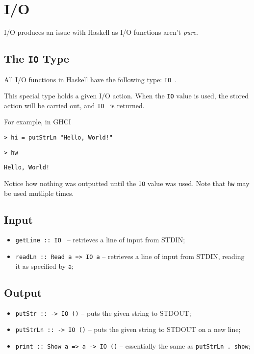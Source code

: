 \section{I/O}

I/O produces an issue with Haskell as I/O functions aren't \textit{pure}.

\subsection{The \texttt{IO} Type}
All I/O functions in Haskell have the following type: \texttt{IO }.

This special type holds a given I/O action. When the \texttt{IO} value is used, the stored action will be carried out, and \texttt{IO } is returned.

For example, in GHCI

\texttt{> hi = putStrLn "Hello, World!"}

\texttt{> hw}

\texttt{Hello, World!}

Notice how nothing was outputted until the \texttt{IO} value was used. Note that \texttt{hw} may be used mutliple times.

\subsection{Input}
\begin{itemize}
  \item \texttt{getLine :: IO } -- retrieves a line of input from STDIN;
  \item \texttt{readLn :: Read a => IO a} -- retrieves a line of input from STDIN, reading it as specified by \texttt{a};
\end{itemize}

\subsection{Output}
\begin{itemize}
  \item \texttt{putStr ::  -> IO ()} -- puts the given string to STDOUT;
  \item \texttt{putStrLn ::  -> IO ()} -- puts the given string to STDOUT on a new line;
  \item \texttt{print :: Show a => a -> IO ()} -- essentially the same as \texttt{putStrLn . show};
\end{itemize}

